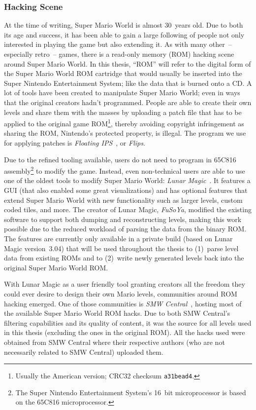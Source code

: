 \subsubsection{Hacking Scene}
\label{sec:hacks}

At the time of writing, Super Mario World is almost 30~years old. Due
to both its age and success, it has been able to gain a large
following of people not only interested in playing the game but also
extending it. As with many other~-- especially retro~-- games, there is
a read-only memory (ROM) hacking scene around Super Mario World. In
this thesis, ``ROM'' will refer to the digital form of the Super Mario
World ROM cartridge that would usually be inserted into the Super
Nintendo Entertainment System; like the data that is burned onto a CD.
A lot of tools have been created to manipulate Super Mario World; even
in ways that the original creators hadn't programmed. People are able
to create their own levels and share them with the masses by uploading
a patch file that has to be applied to the original game
ROM\footnote{Usually the American version; CRC32 checksum
  \texttt{a31bead4}.}, thereby avoiding copyright infringement as
sharing the ROM, Nintendo's protected property, is illegal. The
program we use for applying patches is \emph{Floating
  IPS}~\cite{alcaroAlcaroFlips2019,FloatingIPSFlips}, or \emph{Flips}.

Due to the refined tooling available, users do not need to program in
65C816 assembly\footnote{The Super Nintendo Entertainment System's
  16~bit microprocessor is based on the 65C816 microprocessor.} to
modify the game. Instead, even non-technical users are able to use one
of the oldest tools to modify Super Mario World: \emph{Lunar
  Magic}~\cite{FuSoYaNicheLunar}. It features a GUI (that also enabled
some great visualizations) and has optional features that extend Super
Mario World with new functionality such as larger levels, custom coded
tiles, and more. The creator of Lunar Magic, \emph{FuSoYa}, modified
the existing software to support both dumping and reconstructing
levels, making this work possible due to the reduced workload of
parsing the data from the binary ROM. The features are currently only
available in a private build (based on Lunar Magic version~3.04) that
will be used throughout the thesis to (1)~parse level data from
existing ROMs and to (2)~write newly generated levels back into the
original Super Mario World ROM.

With Lunar Magic as a user friendly tool granting creators all the
freedom they could ever desire to design their own Mario levels,
communities around ROM hacking emerged. One of those communities is
\emph{SMW Central}~\cite{SMWCentralYour}, hosting most of the
available Super Mario World ROM hacks. Due to both SMW Central's
filtering capabilities and its quality of content, it was the source
for all levels used in this thesis (excluding the ones in the original
ROM). All the hacks used were obtained from SMW Central where their
respective authors (who are not necessarily related to SMW Central)
uploaded them.

